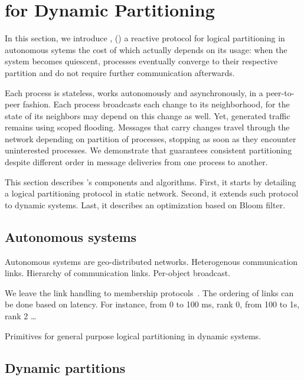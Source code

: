 
\section{\NAME for Dynamic Partitioning}
\label{sec:proposal}

In this section, we introduce \NAME, () a reactive
protocol for logical partitioning in autonomous sytems the cost of
which actually depends on its usage: when the system becomes
quiescent, processes eventually converge to their respective partition
and do not require further communication afterwards.

Each process is stateless, works autonomously and asynchronously, in a
peer-to-peer fashion. Each process broadcasts each change to its
neighborhood, for the state of its neighbors may depend on this change
as well. Yet, generated traffic remains  using scoped
flooding. Messages that carry changes travel through the network
depending on partition of processes, stopping as soon as they
encounter uninterested processes. We demonstrate that \NAME guarantees
consistent partitioning despite different order in message deliveries
from one process to another.

This section describes \NAME's components and algorithms. First, it
starts by detailing a logical partitioning protocol in static
network. Second, it extends such protocol to dynamic systems. Last, it
describes an optimization based on Bloom filter. 



\subsection{Autonomous systems}

Autonomous systems are geo-distributed networks. Heterogenous
communication links. Hierarchy of communication links. Per-object
broadcast.

We leave the link handling to membership protocols~\REF. The ordering
of links can be done based on latency. For instance, from 0 to 100 ms,
rank 0, from 100 to 1s, rank 2 \ldots

\begin{algorithm}
  
  \caption{\label{algo:aaaa}Primitives for general purpose logical
    partitioning in dynamic systems.}
\end{algorithm}


\subsection{Dynamic partitions}

